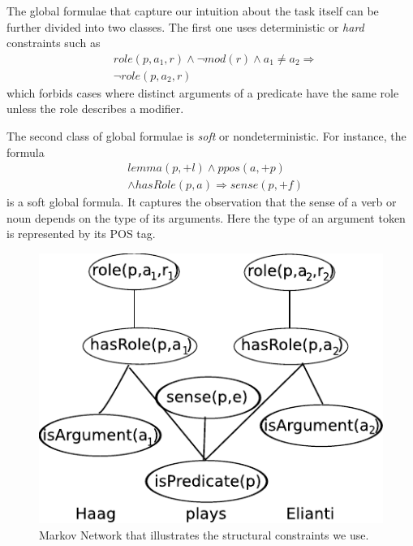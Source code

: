 The global formulae that capture our intuition about the task itself can be further divided into two classes. The first one uses deterministic or \emph{hard} constraints such as
\begin{eqnarray*}
 &role\left(p,a_{1},r\right)\wedge \neg mod\left(r\right)\wedge a_{1}\neq a_{2}  \Rightarrow\\
  & \neg role\left(p,a_{2},r\right)
\end{eqnarray*}
which forbids cases where distinct arguments of a predicate have the same role unless the role describes a modifier.

The second class of global formulae is \emph{soft} or nondeterministic. For instance, the formula  
\begin{eqnarray*}
  & lemma(p,+l) \wedge ppos(a,+p)  \\
  & \wedge hasRole(p,a)  \Rightarrow sense(p,+f) 
\end{eqnarray*}
is a soft global formula. It captures the observation that the sense of a verb or noun depends on the type of its arguments. Here the type of an argument token is represented by its POS tag.


\begin{figure}
\begin{center}
   \includegraphics[scale=.70]{GlobalFormula2}
\end{center}
\caption{Markov Network that illustrates the structural constraints we use.}
\label{fig:global2}
\end{figure}






